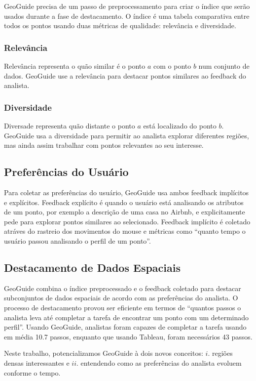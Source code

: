 GeoGuide precisa de um passo de preprocessamento para criar o índice que serão usados durante a fase de destacamento. O índice é uma tabela comparativa entre todos os pontos usando duas métricas de qualidade: relevância e diversidade.

\subsubsection{Relevância}

Relevância representa o quão similar é o ponto $a$ com o ponto $b$ num conjunto de dados. GeoGuide use a relevância para destacar pontos similares ao feedback do analista.

\subsubsection{Diversidade}

Diversade representa quão distante o ponto $a$ está localizado do ponto $b$. GeoGuide usa a diversidade para permitir ao analista explorar diferentes regiões, mas ainda assim trabalhar com pontos relevantes ao seu interesse.

\subsection{Preferências do Usuário}

Para coletar as preferências do usuário, GeoGuide usa ambos feedback implícitos e explícitos. Feedback explícito é quando o usuário está analisando os atributos de um ponto, por exemplo a descrição de uma casa no Airbnb, e explicitamente pede para explorar pontos similares ao selecionado. Feedback implícito é coletado atráves do rastreio dos movimentos do mouse e métricas como  ``quanto tempo o usuário passou analisando o perfil de um ponto''.

\subsection{Destacamento de Dados Espaciais}

GeoGuide combina o índice preprocessado e o feedback coletado para destacar subconjuntos de dados espaciais de acordo com as preferências do analista. O processo de destacamento provou ser eficiente em termos de ``quantos passos o analista leva até completar a tarefa de encontrar um ponto com um determinado perfil''. Usando GeoGuide, analistas foram capazes de completar a tarefa usando em média 10.7 passos, enquanto que usando Tableau, foram necessários 43 passos.

\vspace{25pt}

\noindent Neste trabalho, potencializamos GeoGuide à dois novos conceitos: $i$. regiões densas interessantes e $ii$. entendendo como as preferências do analista evoluem conforme o tempo.